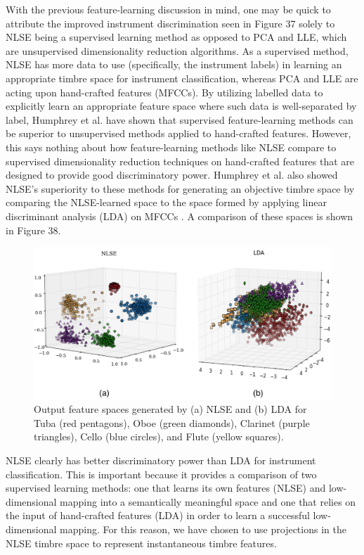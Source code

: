 \documentclass[12pt]{report} 	%
\numberwithin{figure}{chapter}
\numberwithin{table}{chapter}
\numberwithin{equation}{chapter}
\begin{document}
\begin{flushleft}
With the previous feature-learning discussion in mind, one may be quick to attribute the improved instrument discrimination seen in Figure 37 solely to NLSE being a supervised learning method as opposed to PCA and LLE, which are unsupervised dimensionality reduction algorithms. As a supervised method, NLSE has more data to use (specifically, the instrument labels) in learning an appropriate timbre space for instrument classification, whereas PCA and LLE are acting upon hand-crafted features (MFCCs). By utilizing labelled data to explicitly learn an appropriate feature space where such data is well-separated by label, Humphrey et al. have shown that supervised feature-learning methods can be superior to unsupervised methods applied to hand-crafted features. However, this says nothing about how feature-learning methods like NLSE compare to supervised dimensionality reduction techniques on hand-crafted features that are designed to provide good discriminatory power. Humphrey et al. also showed NLSE's superiority to these methods for generating an objective timbre space by comparing the NLSE-learned space to the space formed by applying linear discriminant analysis (LDA) on MFCCs \cite{humphrey2013feature}. A comparison of these spaces is shown in Figure 38.
\begin{figure}[h!]
\begin{center}
\includegraphics[width=\linewidth]{NLSECluster2}
\caption[NLSE vs. LDA instrument clusters]{Output feature spaces generated by (a) NLSE and (b) LDA for Tuba (red pentagons), Oboe (green diamonds), Clarinet (purple triangles), Cello (blue circles), and Flute (yellow squares).}
\end{center}
\end{figure}

NLSE clearly has better discriminatory power than LDA for instrument classification. This is important because it provides a comparison of two supervised learning methods: one that learns its own features (NLSE) and low-dimensional mapping into a semantically meaningful space and one that relies on the input of hand-crafted features (LDA) in order to learn a successful low-dimensional mapping. For this reason, we have chosen to use projections in the NLSE timbre space to represent instantaneous timbre features.


\end{flushleft}
\end{document}
